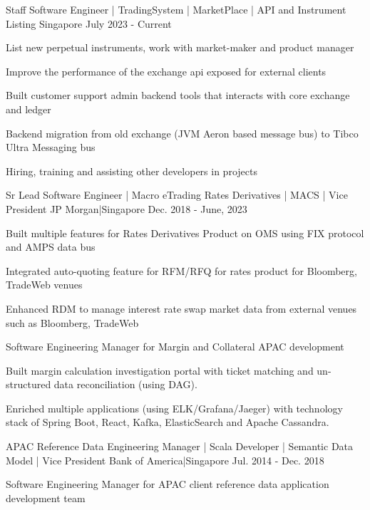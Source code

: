 \begin{cventries}
  {Staff Software Engineer | TradingSystem | MarketPlace | API and Instrument Listing }
  {Singapore}
  {July 2023 - Current}
  {
    \begin{cvitems}
      \item {List new perpetual instruments, work with market-maker and product manager}
      \item {Improve the performance of the exchange api exposed for external clients}
      \item {Built customer support admin backend tools that interacts with core exchange and ledger}
      \item {Backend migration from old exchange (JVM Aeron based message bus) to Tibco Ultra Messaging bus}
      \item {Hiring, training and assisting other developers in projects}
    \end{cvitems}
  }
    {Sr Lead Software Engineer | Macro eTrading Rates Derivatives | MACS | Vice President }
    {JP Morgan|Singapore}
    {Dec. 2018 - June, 2023}
    {
      \begin{cvitems}
        \item {Built multiple features for Rates Derivatives Product on OMS using FIX protocol and AMPS data bus}
        \item {Integrated auto-quoting feature for RFM/RFQ for rates product for Bloomberg, TradeWeb venues}
        \item {Enhanced RDM to manage interest rate swap market data from external venues such as Bloomberg, TradeWeb}
        \item {Software Engineering Manager for Margin and Collateral APAC development}
        \item {Built margin calculation investigation portal with ticket matching and un-structured data reconciliation (using DAG).}
        \item {Enriched multiple applications (using ELK/Grafana/Jaeger) with technology stack of Spring Boot, React, Kafka, ElasticSearch and Apache Cassandra.}
      \end{cvitems}
    }
    {APAC Reference Data Engineering Manager | Scala Developer | Semantic Data Model | Vice President}
    {Bank of America|Singapore}
    {Jul. 2014 - Dec. 2018}
    {
      \begin{cvitems}
        \item {Software Engineering Manager for APAC client reference data application development team}

\end{cvitems}}
\end{cventries}
